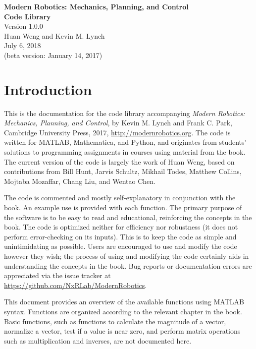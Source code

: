 \documentclass[11pt]{article}
\begin{document}
\begin{center}			%
\Large
{\bf Modern Robotics:  Mechanics, Planning, and Control} \\
{\bf Code Library} \\
\normalsize
Version 1.0.0\\
\vspace*{0.2in}
Huan Weng and Kevin M. Lynch \\
July 6, 2018 \\
(beta version:  January 14, 2017)
\end{center}

\section*{Introduction}			

This is the documentation for the code library accompanying \emph{Modern Robotics:  Mechanics, Planning, and Control}, by Kevin M. Lynch and Frank C. Park, Cambridge University Press, 2017, \url{http://modernrobotics.org}.  The code is written for MATLAB, Mathematica, and Python, and originates from students' solutions to programming assignments in courses using material from the book.  The current version of the code is largely the work of Huan Weng, based on contributions from Bill Hunt, Jarvis Schultz, Mikhail Todes, Matthew Collins, Mojtaba Mozaffar, Chang Liu, and Wentao Chen.  

The code is commented and mostly self-explanatory in conjunction with the book.  An example use is provided with each function.  The primary purpose of the software is to be easy to read and educational, reinforcing the concepts in the book.  The code is optimized neither for efficiency nor robustness (it does not perform error-checking on its inputs).  This is to keep the code as simple and unintimidating as possible.  Users are encouraged to use and modify the code however they wish; the process of using and modifying the code certainly aids in understanding the concepts in the book.  Bug reports or documentation errors are appreciated via the issue tracker at \url{https://github.com/NxRLab/ModernRobotics}.

This document provides an overview of the available functions using MATLAB syntax.  Functions are organized according to the relevant chapter in the book.  Basic functions, such as functions to calculate the magnitude of a vector, normalize a vector, test if a value is near zero, and perform matrix operations such as multiplication and inverses, are not documented here.
\end{document}
